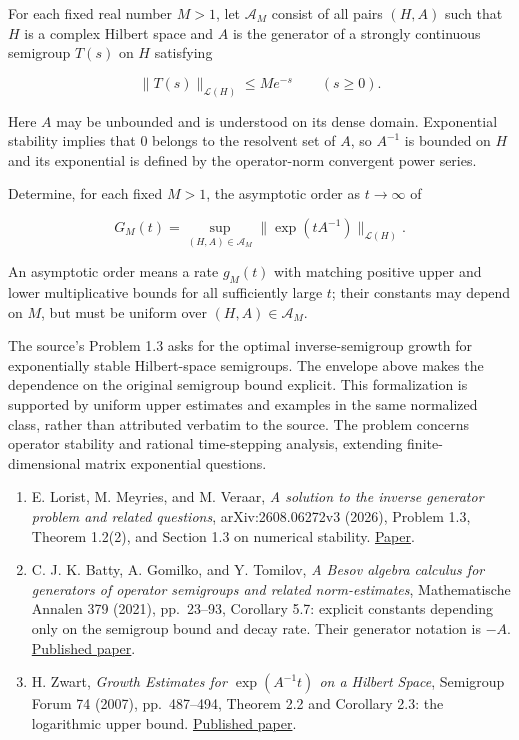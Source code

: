 \documentclass[11pt,a4paper]{article}
\makeatletter
\providecommand{\tightlist}{\setlength{\itemsep}{0pt}\setlength{\parskip}{0pt}}
\renewcommand{\subsection}{\Needspace{4\baselineskip}\@startsection{subsection}{2}{0pt}{9pt plus 1pt minus 1pt}{3pt}{\sffamily\bfseries\normalsize\color{ink}}}
\makeatother
\begin{document}
For each fixed real number \(M>1\), let \(\mathcal A_M\) consist of all
pairs \((H,A)\) such that \(H\) is a complex Hilbert space and \(A\) is
the generator of a strongly continuous semigroup \(T(s)\) on \(H\)
satisfying

\[\|T(s)\|_{\mathcal L(H)}\leq M e^{-s}
\qquad(s\geq0).\]

Here \(A\) may be unbounded and is understood on its dense domain.
Exponential stability implies that \(0\) belongs to the resolvent set of
\(A\), so \(A^{-1}\) is bounded on \(H\) and its exponential is defined
by the operator-norm convergent power series.

Determine, for each fixed \(M>1\), the asymptotic order as
\(t\to\infty\) of

\[G_M(t)=
\sup_{(H,A)\in\mathcal A_M}
\|\exp(tA^{-1})\|_{\mathcal L(H)}.\]

An asymptotic order means a rate \(g_M(t)\) with matching positive upper
and lower multiplicative bounds for all sufficiently large \(t\); their
constants may depend on \(M\), but must be uniform over
\((H,A)\in\mathcal A_M\).

The source's Problem 1.3 asks for the optimal inverse-semigroup growth
for exponentially stable Hilbert-space semigroups. The envelope above
makes the dependence on the original semigroup bound explicit. This
formalization is supported by uniform upper estimates and examples in
the same normalized class, rather than attributed verbatim to the
source. The problem concerns operator stability and rational
time-stepping analysis, extending finite-dimensional matrix exponential
questions.

\newpage
\subsection{References}\label{references}

\begin{enumerate}
\def\labelenumi{\arabic{enumi}.}
\tightlist
\item
  E. Lorist, M. Meyries, and M. Veraar, \emph{A solution to the inverse
  generator problem and related questions}, arXiv:2608.06272v3 (2026),
  Problem 1.3, Theorem 1.2(2), and Section 1.3 on numerical stability.
  \href{https://arxiv.org/html/2608.06272v3}{Paper}.
\item
  C. J. K. Batty, A. Gomilko, and Y. Tomilov, \emph{A Besov algebra
  calculus for generators of operator semigroups and related
  norm-estimates}, Mathematische Annalen 379 (2021), pp.~23--93,
  Corollary 5.7: explicit constants depending only on the semigroup
  bound and decay rate. Their generator notation is \(-A\).
  \href{https://link.springer.com/article/10.1007/s00208-019-01924-2}{Published
  paper}.
\item
  H. Zwart, \emph{Growth Estimates for \(\exp(A^{-1}t)\) on a Hilbert
  Space}, Semigroup Forum 74 (2007), pp.~487--494, Theorem 2.2 and
  Corollary 2.3: the logarithmic upper bound.
  \href{https://link.springer.com/article/10.1007/s00233-006-0679-1}{Published
  paper}.
\end{enumerate}
\end{document}
